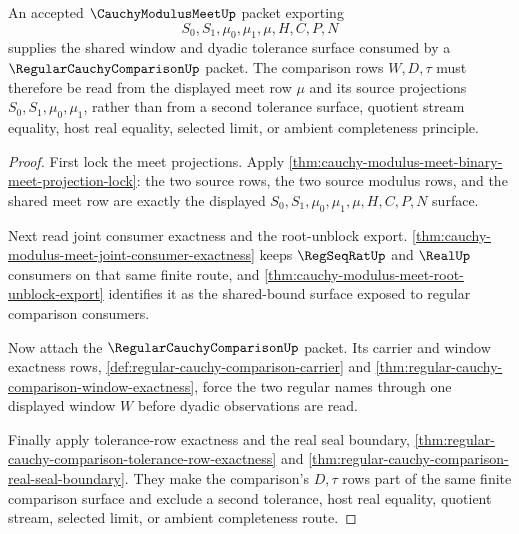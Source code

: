 \begin{theorem}
\label{thm:cauchy-modulus-meet-regular-comparison-window-handoff}
An accepted $\CauchyModulusMeetUp$ packet exporting
$$
S_0,S_1,\mu_0,\mu_1,\mu,H,C,P,N
$$
supplies the shared window and dyadic tolerance surface consumed by a
$\RegularCauchyComparisonUp$ packet. The comparison rows $W,D,\tau$ must
therefore be read from the displayed meet row $\mu$ and its source
projections $S_0,S_1,\mu_0,\mu_1$, rather than from a second tolerance
surface, quotient stream equality, host real equality, selected limit, or
ambient completeness principle.
\end{theorem}
\begin{proof}
First lock the meet projections. Apply
\autoref{thm:cauchy-modulus-meet-binary-meet-projection-lock}: the two source
rows, the two source modulus rows, and the shared meet row are exactly the
displayed $S_0,S_1,\mu_0,\mu_1,\mu,H,C,P,N$ surface.

Next read joint consumer exactness and the root-unblock export.
\autoref{thm:cauchy-modulus-meet-joint-consumer-exactness} keeps
$\RegSeqRatUp$ and $\RealUp$ consumers on that same finite route, and
\autoref{thm:cauchy-modulus-meet-root-unblock-export} identifies it as the
shared-bound surface exposed to regular comparison consumers.

Now attach the $\RegularCauchyComparisonUp$ packet. Its carrier and window
exactness rows, \autoref{def:regular-cauchy-comparison-carrier} and
\autoref{thm:regular-cauchy-comparison-window-exactness}, force the two
regular names through one displayed window $W$ before dyadic observations are
read.

Finally apply tolerance-row exactness and the real seal boundary,
\autoref{thm:regular-cauchy-comparison-tolerance-row-exactness} and
\autoref{thm:regular-cauchy-comparison-real-seal-boundary}. They make the
comparison's $D,\tau$ rows part of the same finite comparison surface and
exclude a second tolerance, host real equality, quotient stream, selected
limit, or ambient completeness route.
\end{proof}

